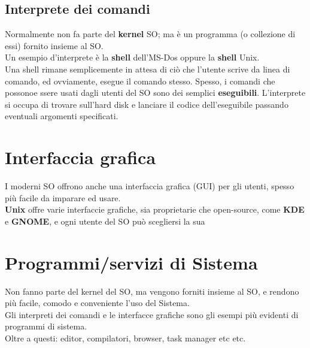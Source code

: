 \subsection{Interprete dei comandi}
Normalmente non fa parte del \textbf{kernel} SO; ma è un programma (o collezione di essi) fornito insieme al SO.\\
Un esempio d'interprete è la \textbf{shell} dell'MS-Dos oppure la \textbf{shell} Unix.\\
Una shell rimane semplicemente in attesa di ciò che l'utente scrive da linea di comando, ed ovviamente, esegue il comando stesso. Spesso, i comandi che possonoe ssere usati dagli utenti del SO sono dei semplici \textbf{eseguibili}. L'interprete si occupa di trovare sull'hard disk e lanciare il codice dell'eseguibile passando eventuali argomenti specificati.

\section{Interfaccia grafica}
I moderni SO offrono anche una interfaccia grafica (GUI) per gli utenti, spesso più facile da imparare ed usare.\\
\textbf{Unix} offre varie interfaccie grafiche, sia proprietarie che open-source, come \textbf{KDE} e \textbf{GNOME}, e ogni utente del SO può scegliersi la sua

\section{Programmi/servizi di Sistema}
Non fanno parte del kernel del SO, ma vengono forniti insieme al SO, e rendono più facile, comodo e conveniente l’uso del Sistema.\\
Gli interpreti dei comandi e le interfacce grafiche sono gli esempi più evidenti di programmi di sistema. \\
Oltre a questi: editor, compilatori, browser, task manager etc etc.

